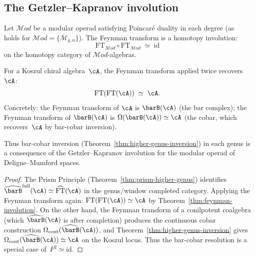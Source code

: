 \subsection{The Getzler--Kapranov involution}
\label{subsec:feynman-involution}

\begin{theorem}\label{thm:feynman-involution}
Let $\mathcal{M}od$ be a modular operad satisfying Poincar\'e
duality in each degree \textup{(}as holds for
$\mathcal{M}od = \{\overline{\mathcal{M}}_{g,n}\}$\textup{)}.
The Feynman transform is a homotopy involution:
\begin{equation}\label{eq:feynman-squared}
\mathrm{FT}_{\mathcal{M}od} \circ \mathrm{FT}_{\mathcal{M}od}
\;\simeq\; \mathrm{id}
\end{equation}
on the homotopy category of $\mathcal{M}od$-algebras.
\end{theorem}

\begin{corollary}\label{cor:feynman-duality-qch}
For a Koszul chiral algebra~$\cA$, the Feynman transform
applied twice recovers~$\cA$:
\begin{equation}\label{eq:double-feynman}
\mathrm{FT}(\mathrm{FT}(\cA))
\;\simeq\; \cA.
\end{equation}
Concretely: the Feynman transform of $\cA$ is $\barB(\cA)$
\textup{(}the bar complex\textup{)}; the Feynman transform of
$\barB(\cA)$ is $\Omega(\barB(\cA)) \simeq \cA$
\textup{(}the cobar, which recovers~$\cA$ by bar-cobar
inversion\textup{)}.

Thus bar-cobar inversion
\textup{(}Theorem~\textup{\ref{thm:higher-genus-inversion})}
in each genus is a consequence of the Getzler--Kapranov involution
for the modular operad of Deligne--Mumford spaces.
\end{corollary}

\begin{proof}
The Prism Principle
(Theorem~\ref{thm:prism-higher-genus}) identifies
$\widehat{\barB}^{\mathrm{full}}(\cA) \simeq
\widehat{\mathrm{FT}}(\cA)$ in the genus/window completed category.
Applying the Feynman transform again:
$\mathrm{FT}(\mathrm{FT}(\cA)) \simeq \cA$ by
Theorem~\ref{thm:feynman-involution}. On the other hand,
the Feynman transform of a conilpotent coalgebra (which
$\widehat{\barB}(\cA)$ is after completion) produces the continuous
cobar construction $\Omega_{\mathrm{cont}}(\widehat{\barB}(\cA))$,
and Theorem~\ref{thm:higher-genus-inversion}
gives $\Omega_{\mathrm{cont}}(\widehat{\barB}(\cA)) \simeq \cA$ on
the Koszul locus.
Thus the bar-cobar resolution is a special case of~$F^2 \simeq
\mathrm{id}$.
\end{proof}

